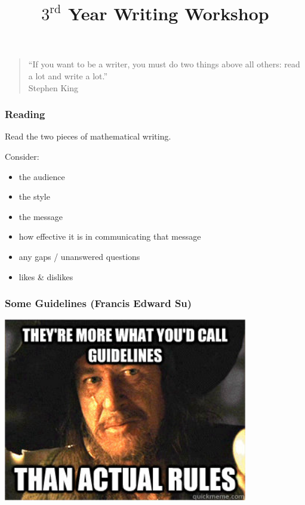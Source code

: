 \documentclass[xcolor={table}]{beamer}
\title{$3^{\text{rd}}$ Year Writing Workshop}
\author{}
\date{}
\begin{document}
\maketitle

\begin{frame}
\begin{quote}\Large
``If you want to be a writer, you must do two things above all others: read a lot and write a lot.''\\
\hfill Stephen King
\end{quote}
\end{frame}

\begin{frame}
\frametitle{Reading}
Read the two pieces of mathematical writing.

Consider:
\begin{itemize}
  \item the audience
  \item the style
  \item the message
  \item how effective it is in communicating that message
  \item any gaps / unanswered questions
  \item likes \& dislikes
\end{itemize}
\end{frame}


\begin{frame}
\frametitle{Some Guidelines (Francis Edward Su)}
\centering
\includegraphics[width=0.8\textwidth]{../img/guidelines.jpeg}
\end{frame}
\end{document}
